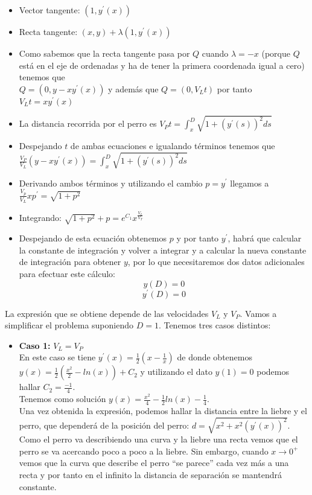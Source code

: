 \begin{example}
\begin{itemize}
\item Vector tangente: $(1, y^\prime(x))$
\item Recta tangente: $(x,y) + \lambda(1, y^\prime(x))$
\item Como sabemos que la recta tangente pasa por $Q$ cuando $\lambda = -x$ (porque $Q$ está en el eje de ordenadas y ha de tener la primera coordenada igual a cero) tenemos que \\$Q=(0, y-xy^\prime(x))$ y además que $Q=(0, V_Lt)$ por tanto $V_Lt = xy^\prime(x)$
\item La distancia recorrida por el perro es $V_Pt =\int_x^D{\sqrt{1+(y^\prime(s))^2ds}}$
\item Despejando $t$ de ambas ecuaciones e igualando términos tenemos que $\frac{V_P}{V_L}(y-xy^\prime(x))=\int_x^D{\sqrt{1+(y^\prime(s))^2ds}}$
\item Derivando ambos términos y utilizando el cambio $p=y^\prime$ llegamos a $\frac{V_p}{V_L}xp^\prime=\sqrt{1+p^2}$
\item Integrando: $\sqrt{1+p^2}+p = e^{C_1}x^\frac{V_L}{V_T}$
\item Despejando de esta ecuación obtenemos $p$ y por tanto $y^\prime$, habrá que calcular la constante de integración y volver a integrar y a calcular la nueva constante de integración para obtener $y$, por lo que necesitaremos dos datos adicionales para efectuar este cálculo:$$y(D)=0$$ $$y^\prime(D)=0$$
\end{itemize}
La expresión que se obtiene depende de las velocidades $V_L$ y $V_P$. Vamos a simplificar el problema suponiendo $D=1$. Tenemos tres casos distintos:
\begin{itemize}
\item \textbf{Caso 1:} $V_L=V_P$\\
En este caso se tiene $y^\prime(x) = \frac{1}{2}(x-\frac{1}{x})$ de donde obtenemos $y(x) = \frac{1}{2}(\frac{x^2}{2}-ln(x))+C_2$ y utilizando el dato $y(1) = 0$ podemos hallar $C_2=\frac{-1}{4}$.\\Tenemos como solución $y(x) = \frac{x^2}{4}-\frac{1}{2}ln(x)-\frac{1}{4}$.\\ Una vez obtenida la expresión, podemos hallar la distancia entre la liebre y el perro, que dependerá de la posición del perro: $d=\sqrt{x^2+x^2(y^\prime(x))^2}$.\\ Como el perro va describiendo una curva y la liebre una recta vemos que el perro se va acercando poco a poco a la liebre. Sin embargo, cuando $x\longrightarrow 0^+$ vemos que la curva que describe el perro ``se parece'' cada vez más a una recta y por tanto en el infinito la distancia de separación se mantendrá constante.\\

\end{itemize}
\end{example}
